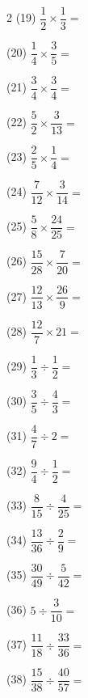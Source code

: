 \documentclass[a4paper, 11pt]{ltjsarticle}
\begin{document}
\newpage

\begin{multicols*}{2}
\noindent (19) \quad $\dfrac{1}{2}\times\dfrac{1}{3} =$ \vspace*{\fill}

\noindent (20) \quad $\dfrac{1}{4}\times\dfrac{3}{5} =$ \vspace*{\fill}

\noindent (21) \quad $\dfrac{3}{4}\times\dfrac{3}{4} =$ \vspace*{\fill}

\noindent (22) \quad $\dfrac{5}{2}\times\dfrac{3}{13} =$ \vspace*{\fill}

\noindent (23) \quad $\dfrac{2}{5}\times\dfrac{1}{4} =$ \vspace*{\fill}

\noindent (24) \quad $\dfrac{7}{12}\times\dfrac{3}{14} =$ \vspace*{\fill}

\noindent (25) \quad $\dfrac{5}{8}\times\dfrac{24}{25} =$ \vspace*{\fill}

\noindent (26) \quad $\dfrac{15}{28}\times\dfrac{7}{20} =$ \vspace*{\fill}

\noindent (27) \quad $\dfrac{12}{13}\times\dfrac{26}{9} =$ \vspace*{\fill}

\noindent (28) \quad $\dfrac{12}{7}\times21 =$ \vspace*{\fill}

\columnbreak
\noindent (29) \quad $\dfrac{1}{3}\div\dfrac{1}{2} =$ \vspace*{\fill}

\noindent (30) \quad $\dfrac{3}{5}\div\dfrac{4}{3} =$ \vspace*{\fill}

\noindent (31) \quad $\dfrac{4}{7}\div2 =$ \vspace*{\fill}

\noindent (32) \quad $\dfrac{9}{4}\div\dfrac{1}{2} =$ \vspace*{\fill}

\noindent (33) \quad $\dfrac{8}{15}\div\dfrac{4}{25} =$ \vspace*{\fill}

\noindent (34) \quad $\dfrac{13}{36}\div\dfrac{2}{9} =$ \vspace*{\fill}

\noindent (35) \quad $\dfrac{30}{49}\div\dfrac{5}{42} =$ \vspace*{\fill}

\noindent (36) \quad $5\div\dfrac{3}{10} =$ \vspace*{\fill}

\noindent (37) \quad $\dfrac{11}{18}\div\dfrac{33}{36} =$ \vspace*{\fill}

\noindent (38) \quad $\dfrac{15}{38}\div\dfrac{40}{57} =$ \vspace*{\fill}
\end{multicols*}
\end{document}
